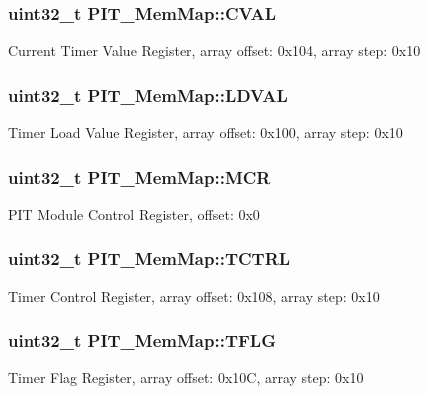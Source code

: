 \subsubsection[{C\+V\+A\+L}]{\setlength{\rightskip}{0pt plus 5cm}uint32\+\_\+t P\+I\+T\+\_\+\+Mem\+Map\+::\+C\+V\+A\+L}\label{struct_p_i_t___mem_map_a7d3d1a5913a28cfb4ca0e120ebf37087}
Current Timer Value Register, array offset\+: 0x104, array step\+: 0x10 \hypertarget{struct_p_i_t___mem_map_ad664bbe0f8b53ee1e533727db4da3fb2}{}
\subsubsection[{L\+D\+V\+A\+L}]{\setlength{\rightskip}{0pt plus 5cm}uint32\+\_\+t P\+I\+T\+\_\+\+Mem\+Map\+::\+L\+D\+V\+A\+L}\label{struct_p_i_t___mem_map_ad664bbe0f8b53ee1e533727db4da3fb2}
Timer Load Value Register, array offset\+: 0x100, array step\+: 0x10 \hypertarget{struct_p_i_t___mem_map_a99390c5764693e07c37d40ead441a7a4}{}
\subsubsection[{M\+C\+R}]{\setlength{\rightskip}{0pt plus 5cm}uint32\+\_\+t P\+I\+T\+\_\+\+Mem\+Map\+::\+M\+C\+R}\label{struct_p_i_t___mem_map_a99390c5764693e07c37d40ead441a7a4}
P\+I\+T Module Control Register, offset\+: 0x0 \hypertarget{struct_p_i_t___mem_map_a567cdea5c7d615341f95f1438020a7e1}{}
\subsubsection[{T\+C\+T\+R\+L}]{\setlength{\rightskip}{0pt plus 5cm}uint32\+\_\+t P\+I\+T\+\_\+\+Mem\+Map\+::\+T\+C\+T\+R\+L}\label{struct_p_i_t___mem_map_a567cdea5c7d615341f95f1438020a7e1}
Timer Control Register, array offset\+: 0x108, array step\+: 0x10 \hypertarget{struct_p_i_t___mem_map_add88e740d4ec7a83e66cf9ad79cd027a}{}
\subsubsection[{T\+F\+L\+G}]{\setlength{\rightskip}{0pt plus 5cm}uint32\+\_\+t P\+I\+T\+\_\+\+Mem\+Map\+::\+T\+F\+L\+G}\label{struct_p_i_t___mem_map_add88e740d4ec7a83e66cf9ad79cd027a}
Timer Flag Register, array offset\+: 0x10\+C, array step\+: 0x10 

